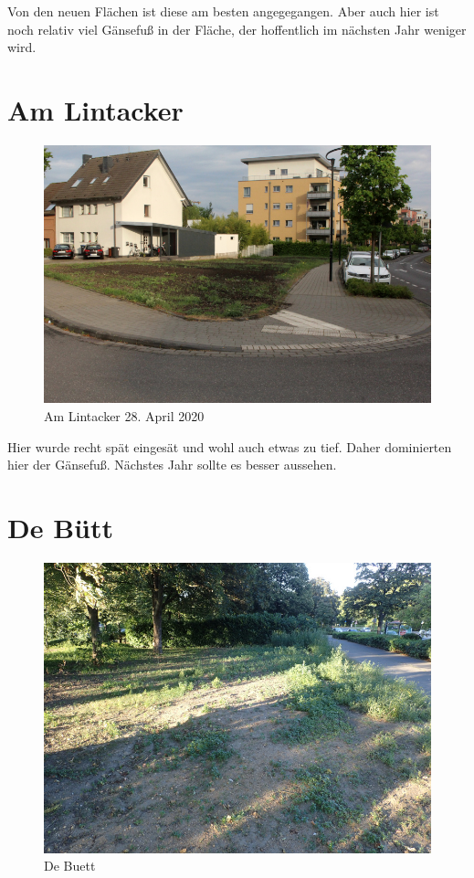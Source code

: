 \documentclass[11pt]{article}
\begin{document}
Von den neuen Flächen ist diese am besten angegegangen. Aber auch hier ist noch relativ viel Gänsefuß in der Fläche, der hoffentlich im nächsten Jahr weniger wird.

\clearpage
\section{Am Lintacker}
\begin{figure}[h!]
  \includegraphics[width=\linewidth]{img/lintacker/april.jpg}
  \caption{Am Lintacker 28. April 2020}
\end{figure}

Hier wurde recht spät eingesät und wohl auch etwas zu tief. Daher dominierten hier der Gänsefuß.
Nächstes Jahr sollte es besser aussehen.

\clearpage
\section{De Bütt}
\begin{figure}[h!]
  \includegraphics[width=\linewidth]{img/buett/juli.jpg}
  \caption{De Buett}
\end{figure}
\end{document}
